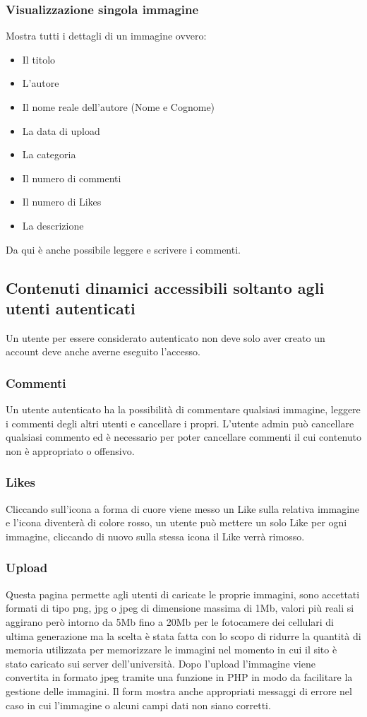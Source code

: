 \documentclass[openany, a4paper, 12pt]{report}
\begin{document}
		\subsubsection{Visualizzazione singola immagine}
		Mostra tutti i dettagli di un immagine ovvero:
		\begin{itemize}
					\item Il titolo
					\item L'autore
					\item Il nome reale dell'autore (Nome e Cognome)
					\item La data di upload
					\item La categoria
					\item Il numero di commenti
					\item Il numero di Likes
					\item La descrizione
		\end{itemize}
		Da qui è anche possibile leggere e scrivere i commenti.
				
	\subsection{Contenuti dinamici accessibili soltanto agli utenti autenticati}
	Un utente per essere considerato autenticato non deve solo aver creato un account deve anche averne eseguito l'accesso.
	
		\subsubsection{Commenti}
		Un utente autenticato ha la possibilità di commentare qualsiasi immagine, leggere i commenti degli altri utenti e cancellare i propri. L'utente admin può cancellare qualsiasi commento ed è necessario per poter cancellare commenti il cui contenuto non è appropriato o offensivo.
		
		\subsubsection{Likes}
		Cliccando sull'icona a forma di cuore viene messo un Like sulla relativa immagine e l'icona diventerà di colore rosso, un utente può mettere un solo Like per ogni immagine, cliccando di nuovo sulla stessa icona il Like verrà rimosso.
		
		\subsubsection{Upload}
		Questa pagina permette agli utenti di caricate le proprie immagini, sono accettati formati di tipo png, jpg o jpeg di dimensione massima di 1Mb, valori più reali si aggirano però intorno da 5Mb fino a 20Mb per le fotocamere dei cellulari di ultima generazione ma la scelta è stata fatta con lo scopo di ridurre la quantità di memoria utilizzata per memorizzare le immagini nel momento in cui il sito è stato caricato sui server dell'università. Dopo l'upload l'immagine viene convertita in formato jpeg tramite una funzione in PHP in modo da facilitare la gestione delle immagini. Il form mostra anche appropriati messaggi di errore nel caso in cui l'immagine o alcuni campi dati non siano corretti.
		
\end{document}
